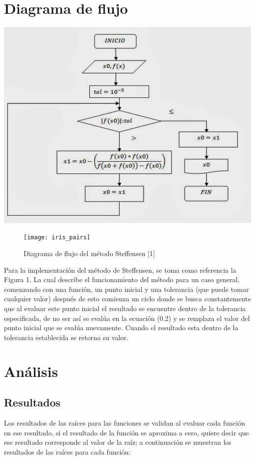 \documentclass[]{hdsr}
\begin{document}
\section{Diagrama de flujo}
\begin{center}
  \includegraphics[width=\textwidth]{figs/steffensen03.jpg} 
  \begin{figure}[H]
    \centering
    \texttt{[image: iris\_pairs]} \\
    \caption{Diagrama de flujo del método Steffensen [1]}
    \label{fig:my_label}
\end{figure}
\end{center}

Para la implementación del método de Steffensen, se toma como referencia la Figura 1. La cual describe el funcionamiento del método para un caso general, comenzando con una función, un punto inicial y una tolerancia (que puede tomar cualquier valor) después de esto comienza un ciclo donde se busca constantemente que al evaluar este punto inicial el resultado se encuentre dentro de la tolerancia especificada, de no ser así se evalúa en la ecuación (0.2) y se remplaza el valor del punto inicial que se evalúa nuevamente. Cuando el resultado esta dentro de la tolerancia establecida se retorna su valor. \newline

\section{Análisis}
\subsection{Resultados}
Los resultados de las raíces para las funciones se validan al evaluar cada función en ese resultado, si el resultado de la función se aproxima a cero, quiere decir que ese resultado corresponde al valor de la raíz; a continuación se muestran los resultados de las raíces para cada función:\newline
\end{document}
